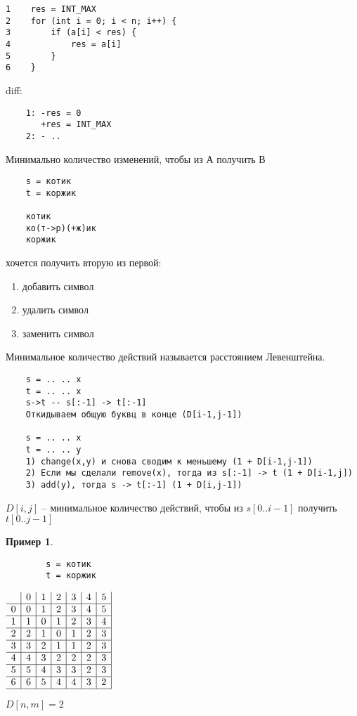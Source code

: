 \documentclass{book}
\theoremstyle{definition}
\newtheorem*{example}{Пример}
\begin{document}
\begin{verbatim}
1    res = INT_MAX
2    for (int i = 0; i < n; i++) {
3        if (a[i] < res) {
4            res = a[i]
5        }
6    }
\end{verbatim}

diff:
\begin{verbatim}
    1: -res = 0
       +res = INT_MAX
    2: - ..
\end{verbatim}

Минимально количество изменений, чтобы из А получить В

\begin{verbatim}
    s = котик
    t = коржик

    котик
    ко(т->р)(+ж)ик
    коржик
\end{verbatim}

хочется получить вторую из первой:
\begin{enumerate}
    \item добавить символ
    \item удалить символ
    \item заменить символ
\end{enumerate}

Минимальное количество действий называется расстоянием Левенштейна.

\begin{verbatim}
    s = .. .. x
    t = .. .. x
    s->t -- s[:-1] -> t[:-1]
    Откидываем общую буквц в конце (D[i-1,j-1])

    s = .. .. x
    t = .. .. y
    1) change(x,y) и снова сводим к меньшему (1 + D[i-1,j-1])
    2) Если мы сделали remove(x), тогда из s[:-1] -> t (1 + D[i-1,j])
    3) add(y), тогда s -> t[:-1] (1 + D[i,j-1])
\end{verbatim}

$D[i,j]$ -- минимальное количество действий, чтобы из $s[0..i-1]$ получить  $t[0..j-1]$

\begin{example}
    \begin{verbatim}
        s = котик
        t = коржик
    \end{verbatim}
    $\begin{array}{c|c|c|c|c|c|c|}
        &0&1&2&3&4&5\\\hline
        0&0&1&2&3&4&5\\ \hline
        1&1&0&1&2&3&4\\\hline
        2&2&1&0&1&2&3\\\hline
        3&3&2&1&1&2&3\\\hline
        4&4&3&2&2&2&3\\\hline
        5&5&4&3&3&2&3\\\hline
        6&6&5&4&4&3&2\\\hline
    \end{array}$

    $D[n,m] = 2$
\end{example}
\end{document}
